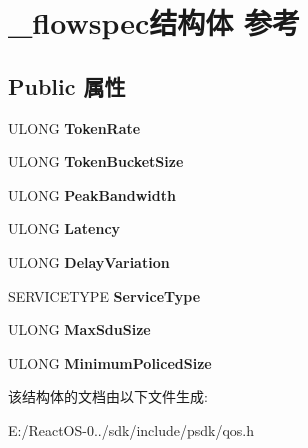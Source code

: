 \hypertarget{struct__flowspec}{}\section{\+\_\+flowspec结构体 参考}
\label{struct__flowspec}
\subsection*{Public 属性}
\begin{DoxyCompactItemize}
\item 
\mbox{\label{struct__flowspec_aa24acf18c61bb052d9cca7d2f99289d8}} 
U\+L\+O\+NG {\bfseries Token\+Rate}
\item 
\mbox{\label{struct__flowspec_ad44ca4cd7d31c2ced9f29fe0aba633d9}} 
U\+L\+O\+NG {\bfseries Token\+Bucket\+Size}
\item 
\mbox{\label{struct__flowspec_a2eaa47bca03e543346835ca73340eb53}} 
U\+L\+O\+NG {\bfseries Peak\+Bandwidth}
\item 
\mbox{\label{struct__flowspec_a46b900b17a17143b16f0521a70242eb5}} 
U\+L\+O\+NG {\bfseries Latency}
\item 
\mbox{\label{struct__flowspec_a66827b3213ccc3c40fe1c08dc295709c}} 
U\+L\+O\+NG {\bfseries Delay\+Variation}
\item 
\mbox{\label{struct__flowspec_ab2da7a99346b548094d83381f5c43fbf}} 
S\+E\+R\+V\+I\+C\+E\+T\+Y\+PE {\bfseries Service\+Type}
\item 
\mbox{\label{struct__flowspec_a32a3d74c031987d0a53e03db092221cc}} 
U\+L\+O\+NG {\bfseries Max\+Sdu\+Size}
\item 
\mbox{\label{struct__flowspec_a41a3a6605381345e51568a8421f2ca81}} 
U\+L\+O\+NG {\bfseries Minimum\+Policed\+Size}
\end{DoxyCompactItemize}


该结构体的文档由以下文件生成\+:\begin{DoxyCompactItemize}
\item 
E\+:/\+React\+O\+S-\/0../sdk/include/psdk/qos.\+h\end{DoxyCompactItemize}
